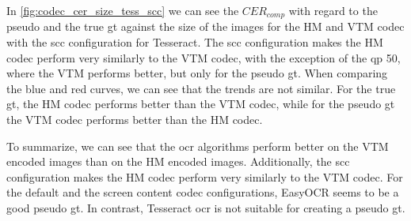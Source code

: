 In \autoref{fig:codec_cer_size_tess_scc} we can see the $CER_{comp}$ with regard to the pseudo and the true \gls{gt} against the size of the images for the HM and VTM codec with the \gls{scc} configuration for Tesseract.
The \gls{scc} configuration makes the HM codec perform very similarly to the VTM codec, with the exception of the \gls{qp} 50, where the VTM performs better, but only for the pseudo \gls{gt}.
When comparing the blue and red curves, we can see that the trends are not similar.
For the true \gls{gt}, the HM codec performs better than the VTM codec, while for the pseudo \gls{gt} the VTM codec performs better than the HM codec.

To summarize, we can see that the \gls{ocr} algorithms perform better on the VTM encoded images than on the HM encoded images.
Additionally, the \gls{scc} configuration makes the HM codec perform very similarly to the VTM codec.
For the default and the screen content codec configurations, EasyOCR seems to be a good pseudo \gls{gt}.
In contrast, Tesseract \gls{ocr} is not suitable for creating a pseudo \gls{gt}.
